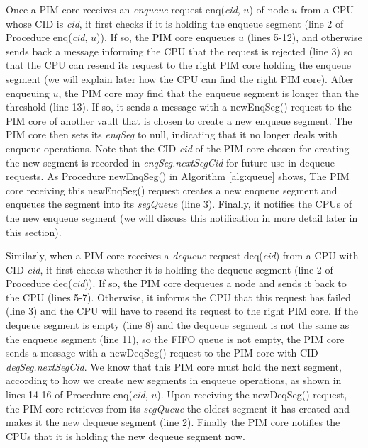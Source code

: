 Once a PIM core receives an \emph{enqueue} request enq(\textit{cid}, $u$) of node $u$ from a CPU whose CID is \textit{cid},
it first checks if it is holding the enqueue segment (line 2 of Procedure enq(\textit{cid}, $u$)).
If so, the PIM core enqueues $u$ (lines 5-12), and otherwise sends back a message
informing the CPU that the request is rejected (line 3) so that
the CPU can resend its request to the right PIM core holding the enqueue segment
(we will explain later how the CPU can find the right PIM core).
After enqueuing $u$, the PIM core may find that the enqueue segment is longer than the threshold (line 13).
If so, it sends a message with a newEnqSeg() request to the PIM core of another vault that is chosen 
to create a new enqueue segment.
The PIM core then sets its \textit{enqSeg} to null, indicating that it no longer deals with enqueue operations.
Note that the CID \textit{cid} of the PIM core chosen for creating the new segment is recorded in 
\textit{enqSeg.nextSegCid} for future use in dequeue requests.
As Procedure newEnqSeg() in Algorithm \ref{alg:queue} shows,
The PIM core receiving this newEnqSeg() request creates a new enqueue segment and 
enqueues the segment into its \textit{segQueue} (line 3).
Finally, it notifies the CPUs of the new enqueue segment 
(we will discuss this notification in more detail later in this section).

Similarly, when a PIM core receives a \emph{dequeue} request deq(\textit{cid}) from a CPU with CID \textit{cid},
it first checks whether it is holding the dequeue segment (line 2 of Procedure deq(\textit{cid})).
If so, the PIM core dequeues a node and sends it back to the CPU (lines 5-7).
Otherwise, it informs the CPU that this request has failed (line 3) and
the CPU will have to resend its request to the right PIM core.
If the dequeue segment is empty (line 8) and the dequeue segment is not the same as 
the enqueue segment (line 11), so the FIFO queue is not empty, 
the PIM core sends a message with a newDeqSeg() request 
to the PIM core with CID \textit{deqSeg.nextSegCid}. 
We know that this PIM core must hold the next segment, 
according to how we create new segments in enqueue operations, 
as shown in lines 14-16 of Procedure enq(\textit{cid}, $u$). 
Upon receiving the newDeqSeg() request, 
the PIM core retrieves from its \textit{segQueue} the oldest segment it has created and 
makes it the new dequeue segment (line 2). 
Finally the PIM core notifies the CPUs that it is holding the new dequeue segment now.


